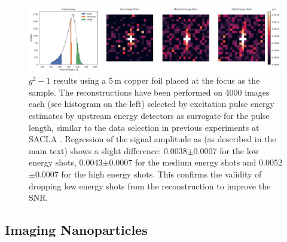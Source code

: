 \begin{figure}
	\centering
	\includegraphics[width=\linewidth]{images/energy_binned.pdf}
	\caption[Excitation energy binned reconstruction]{$g^2-1$ results using a 5\,\textmu m copper foil placed at the focus as the sample. The reconstructions have been performed on 4000 images each (see histogram on the left)  selected by excitation pulse energy estimates by upstream energy detectors as surrogate for the pulse length, similar to the data selection in previous experiments at SACLA \cite{inoue2019}. Regression of the signal amplitude as (as described in the main text) shows a slight difference: 0.0038$\pm$0.0007 for the low energy shots, 0.0043$\pm$0.0007 for the medium energy shots and 0.0052$\pm$0.0007 for the high energy shots. This confirms the validity of dropping low energy shots from the reconstruction to improve the SNR.}
	\label{fig:energy_binned}
\end{figure}

\subsection{Imaging Nanoparticles}

